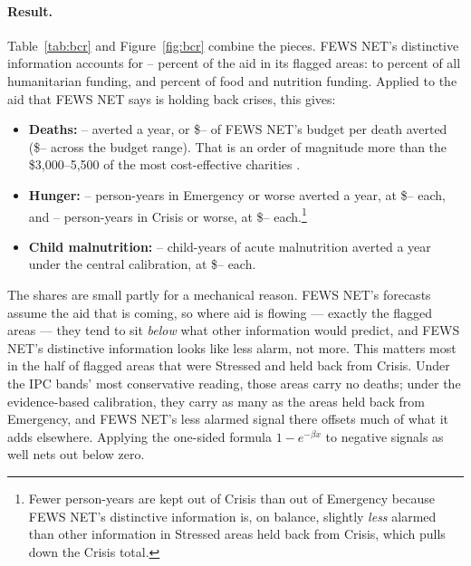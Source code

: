 \documentclass[11pt]{article}
\begin{document}
\begin{appendices}
\paragraph{Result.} Table~\ref{tab:bcr} and Figure~\ref{fig:bcr} combine the pieces. FEWS NET's distinctive information accounts for \dShareLo{}--\dShareHi{} percent of the aid in its flagged areas: \bcShareOne{} to \bcShareTwo{} percent of all humanitarian funding, and \bcShareThree{} percent of food and nutrition funding. Applied to the aid that FEWS NET says is holding back crises, this gives:
\begin{itemize}
  \item \textbf{Deaths:} \dDeathsLo{}--\dDeathsHi{} averted a year, or \$\bcDistinctLo{}--\bcDistinctHi{} of FEWS NET's budget per death averted (\$\dCostBudgetLo{}--\dCostBudgetHi{} across the budget range). That is an order of magnitude more than the \$3,000--5,500 of the most cost-effective charities \citep{givewell2024}.
  \item \textbf{Hunger:} \dEmergLo{}--\dEmergHi{} person-years in Emergency or worse averted a year, at \$\dCostEmergLo{}--\dCostEmergHi{} each, and \dCrisisLo{}--\dCrisisHi{} person-years in Crisis or worse, at \$\dCostCrisisLo{}--\dCostCrisisHi{} each.\footnote{Fewer person-years are kept out of Crisis than out of Emergency because FEWS NET's distinctive information is, on balance, slightly \emph{less} alarmed than other information in Stressed areas held back from Crisis, which pulls down the Crisis total.}
  \item \textbf{Child malnutrition:} \dWastLo{}--\dWastHi{} child-years of acute malnutrition averted a year under the central calibration, at \$\dCostWastLo{}--\dCostWastHi{} each.
\end{itemize}
The shares are small partly for a mechanical reason. FEWS NET's forecasts assume the aid that is coming, so where aid is flowing --- exactly the flagged areas --- they tend to sit \emph{below} what other information would predict, and FEWS NET's distinctive information looks like less alarm, not more. This matters most in the half of flagged areas that were Stressed and held back from Crisis. Under the IPC bands' most conservative reading, those areas carry no deaths; under the evidence-based calibration, they carry as many as the areas held back from Emergency, and FEWS NET's less alarmed signal there offsets much of what it adds elsewhere. Applying the one-sided formula $1-e^{-\beta x}$ to negative signals as well nets out below zero.


\end{appendices}
\end{document}
